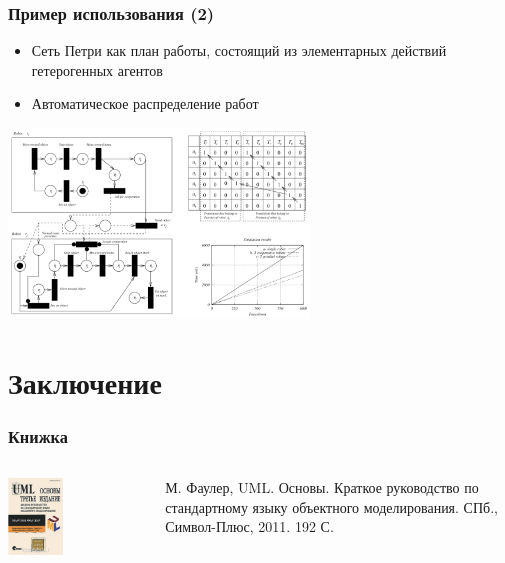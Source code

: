 \documentclass[xetex,mathserif,serif]{beamer}
\begin{document}
	\begin{frame}
		\frametitle{Пример использования (2)}
		\begin{itemize}
			\item Сеть Петри как план работы, состоящий из элементарных действий гетерогенных агентов
			\item Автоматическое распределение работ
		\end{itemize}
		\begin{center}
			\includegraphics[width=0.6\textwidth]{petriUsageExample2.png}
		\end{center}
	\end{frame}

	\section{Заключение}

	\begin{frame}
		\frametitle{Книжка}
		\begin{columns}
			\begin{column}{0.5\textwidth}
				\begin{center}
					\includegraphics[width=0.4\textwidth]{umlBookCover.png}
				\end{center}
			\end{column}
			\begin{column}{0.5\textwidth}
				М. Фаулер, UML. Основы. Краткое руководство по стандартному языку объектного моделирования. СПб., Символ-Плюс, 2011. 192 С.
			\end{column}
		\end{columns}
	\end{frame}
\end{document}
